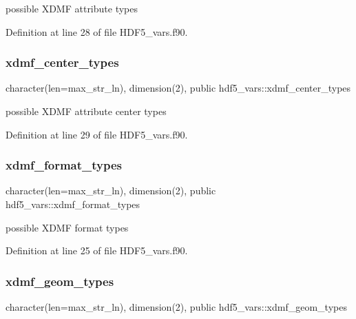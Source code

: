 possible X\+D\+MF attribute types 



Definition at line 28 of file H\+D\+F5\+\_\+vars.\+f90.

\mbox{\label{namespacehdf5__vars_a7f20d570d2304c8e953646599bf61d73}} 
\subsubsection{\texorpdfstring{xdmf\+\_\+center\+\_\+types}{xdmf\_center\_types}}
{\footnotesize\ttfamily character(len=max\+\_\+str\+\_\+ln), dimension(2), public hdf5\+\_\+vars\+::xdmf\+\_\+center\+\_\+types}



possible X\+D\+MF attribute center types 



Definition at line 29 of file H\+D\+F5\+\_\+vars.\+f90.

\mbox{\label{namespacehdf5__vars_ab9c0d2270239bf1963c6294ab7198f8c}} 
\subsubsection{\texorpdfstring{xdmf\+\_\+format\+\_\+types}{xdmf\_format\_types}}
{\footnotesize\ttfamily character(len=max\+\_\+str\+\_\+ln), dimension(2), public hdf5\+\_\+vars\+::xdmf\+\_\+format\+\_\+types}



possible X\+D\+MF format types 



Definition at line 25 of file H\+D\+F5\+\_\+vars.\+f90.

\mbox{\label{namespacehdf5__vars_acabe6ee64c1612c30ab37774678238e5}} 
\subsubsection{\texorpdfstring{xdmf\+\_\+geom\+\_\+types}{xdmf\_geom\_types}}
{\footnotesize\ttfamily character(len=max\+\_\+str\+\_\+ln), dimension(2), public hdf5\+\_\+vars\+::xdmf\+\_\+geom\+\_\+types}



